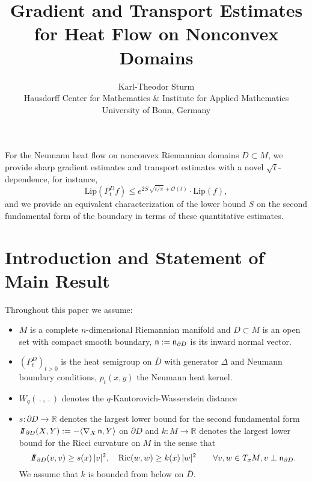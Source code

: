 \documentclass[a4paper,12pt]{article}
\theoremstyle{plain}
\def\R{{\mathbb R}}
\def\R{{\mathbb R}}%
\begin{document}
\title{\bfseries  Gradient and Transport Estimates for Heat Flow on Nonconvex Domains}


\author{Karl-Theodor Sturm
\\[1cm]
\small Hausdorff Center for Mathematics \& Institute for Applied Mathematics\\
\small University of Bonn, Germany 
}
 







\maketitle

\abstract
For the Neumann heat flow on nonconvex Riemannian domains $D\subset M$, we provide sharp gradient estimates and transport estimates with a novel $\sqrt t$-dependence, 
for instance,
$$\text{Lip}( P^D_tf)\le e^{2S \, \sqrt{t/\pi}+\mathcal{O}(t)}\cdot \text{Lip} (f),$$
and we provide an equivalent characterization of the lower bound $S$ on the second fundamental form of the boundary in terms of these quantitative estimates.



\section{Introduction and Statement of Main Result}

Throughout this paper we assume:
\begin{itemize}
\item
$M$ is a complete  $n$-dimensional Riemannian manifold and $D\subset M$ is an open set with compact smooth boundary, ${\sf n}:={\sf n}_{\partial D}$ is its inward normal vector.
\item
$(P^D_t)_{t>0}$ is the heat semigroup on $\overline D$ with generator $\Delta$ and Neumann boundary conditions, $p_t(x,y)$ the Neumann heat kernel.
\item $W_q(\, .\,, \, .\,)$ denotes the $q$-Kantorovich-Wasserstein distance 
\item
$s: \partial D\to\R$ denotes the largest lower bound for the second fundamental form ${I\!\!I}_{\partial D}(X,Y):=-\langle\nabla_X\, {\sf n},Y\rangle$ on $\partial D$ and 
$k: M\to\R$ denotes the largest lower bound for the Ricci curvature on $M$ in the sense that
$${I\!\!I}_{\partial D}(v,v)\ge s(x)\, |v|^2, \quad \text{Ric}(w,w)\ge k(x)\, |w|^2\qquad \forall v,w\in T_xM, v\perp{\sf n}_{\partial D}.$$
We assume that $k$ is bounded from below on $\bar D$.
\end{itemize}
\end{document}
